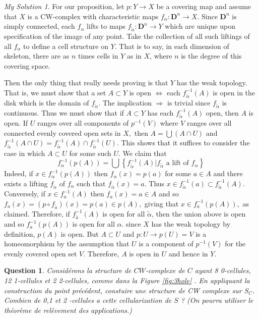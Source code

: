 \documentclass[]{article}
\newtheorem{prop}{Question}
\theoremstyle{remark}
\newtheorem*{sol}{My Solution}
\begin{document}
\begin{sol}
	For our proposition, let $p: Y \rightarrow X$ be a covering map and assume that $X$ is a CW-complex with characteristic maps $f_{\alpha}: \mathbf{D}^{n} \rightarrow X$. Since $\mathbf{D}^{n}$ is simply connected, each $f_{\alpha}$ lifts to maps $f_{\tilde{\alpha}}: \mathbf{D}^{n} \rightarrow Y$ which are unique upon specification of the image of any point. Take the collection of all such liftings of all $f_{\alpha}$ to define a cell structure on $Y .$ That is to say, in each dimension of skeleton, there are as $ n $ times cells in $ Y $ as in $ X $, where $ n $ is the degree of this covering space.

Then the only thing that really needs proving is that $Y$ has the weak topology. That is, we must show that a set $A \subset Y$ is open $\Leftrightarrow$ each $f_{\tilde{\alpha}}^{-1}(A)$ is open in the disk which is the domain of $f_{\tilde{\alpha}}$. The implication $\Rightarrow$ is trivial since $f_{\tilde{\alpha}}$ is continuous. Thus we must show that if $A \subset Y$ has each $f_{\tilde{\alpha}}^{-1}(A)$ open, then $A$ is open. If $U$ ranges over all components of $p^{-1}(V)$ where $V$ ranges over all connected evenly covered open sets in $X,$ then $A=\bigcup(A \cap U)$ and $f_{\tilde{\alpha}}^{-1}(A \cap U)=f_{\tilde{\alpha}}^{-1}(A) \cap f_{\tilde{\alpha}}^{-1}(U) .$ This shows that it suffices to consider the case in which $A \subset U$ for some such $U$.
We claim that
\[ f_{\alpha}^{-1}(p(A))=\bigcup\left\{f_{\tilde{\alpha}}^{-1}(A) | f_{\tilde{\alpha}} \text { a lift of } f_{\alpha}\right\} \] Indeed, if $x \in f_{\alpha}^{-1}(p(A))$ then $f_{\alpha}(x)=p(a)$ for some $a \in A$ and there exists a lifting $f_{\tilde{\alpha}}$ of $f_{\alpha}$ such that $f_{\tilde{\alpha}}(x)=a .$ Thus $x \in f_{\tilde{\alpha}}^{-1}(a) \subset f_{\tilde{\alpha}}^{-1}(A)$. Conversely, if $x \in f_{a}^{-1}(A)$ then $f_{a}(x)=a \in A$ and so $f_{a}(x)=\left(p \circ f_{\tilde{a}}\right)(x)=p(a) \in p(A),$ giving that $x \in f_{a}^{-1}(p(A)),$ as claimed.
Therefore, if $f_{\tilde a}^{-1}(A)$ is open for all $\tilde{\alpha}$, then the union above is open and so $f_{a}^{-1}(p(A))$ is open for all $\alpha$. since $X$ has the weak topology by definition, $p(A)$ is open. But $A \subset U$ and $p: U \rightarrow p(U)=V$ is a homeomorphism by the assumption that $U$ is a component of $p^{-1}(V)$ for the evenly covered open set $V .$ Therefore, $A$ is open in $U$ and hence in $Y .$
\end{sol}
\begin{prop}
	Considérons la structure de $C W$-complexe de $C$ ayant 8 0-cellules, 12 1-cellules et 2 2-cellules, comme dans la Figure \ref{fig:3hole} . En appliquant la construction du point précédent, constuire une structure de CW complexe sur $S_{C}$. Combien de 0,1 et 2 -cellules a cette cellularization de $S$ ? (On pourra utiliser le théorème de relèvement des applications.)
\end{prop}
\end{document}
